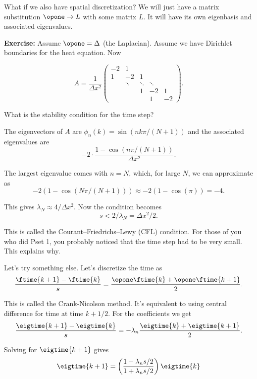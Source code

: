 \begin{frame}{What if we also have spatial discretization?}
	\pause
	We will just have a matrix substitution $ \opone \to L $ with some matrix $ L $. It will have its own eigenbasis and associated eigenvalues.
	
	\pause
	\textbf{Exercise:} Assume $ \opone = \Delta $ (the Laplacian). Assume we have Dirichlet boundaries for the heat equation. Now 
	
	\[  
	A = \frac{1}{\Delta x^2} \begin{pmatrix}
		 -2 & 1  &   &  &  \\
		1 & -2 & 1  &   &    \\
		&  \ddots & \ddots & \ddots  &  \\
		& & 1 & -2 & 1 \\
		& & & 1 & -2 
	\end{pmatrix}.
	\]
	
	What is the stability condition for the time step?
\end{frame}

\begin{frame}
	The eigenvectors of $ A $ are $ \phi_n(k) = \sin(n k \pi/(N+1)) $ and the associated eigenvalues are 
	$$ -2\cdot\frac{1-\cos(n\pi/(N+1))}{\Delta x^2}. $$
	
	\pause
	The largest eigenvalue comes with $ n = N $, which, for large $ N $, we can approximate as
	$$ -2(1-\cos(N\pi/(N+1))) \approx -2(1 - \cos(\pi)) = -4. $$
	
	\pause
	This gives $ \lambda_N \approx 4/\Delta x^2. $ Now the condition becomes 
	\[  
	s < 2/\lambda_N = \Delta x^2/2.
	\]
	
	\pause
	This is called the Courant–Friedrichs–Lewy (CFL) condition. For those of you who did Pset 1, you probably noticed that the time step had to be very small. This explains why.
\end{frame}

\begin{frame}
	Let's try something else. Let's discretize the time as 
	\[ \frac{\ftime{k+1} - \ftime{k}}{s} = \frac{\opone \ftime{k} +  \opone \ftime{k+1}}{2}. \]
	
	\pause
	This is called the Crank-Nicolson method. It's equivalent to using central difference for time at time $ k+1/2 $. For the coefficients we get 
		\[ \frac{\eigtime{k+1} - \eigtime{k}}{s} = -\lambda_n \frac{ \eigtime{k} +  \eigtime{k+1}}{2}. \]
	
	\pause
	Solving for $ \eigtime{k+1} $ gives 
	\[ \eigtime{k+1} = \left(
	\frac{1 - \lambda_n s/2 }{1 + \lambda_n s/ 2}
	\right) \eigtime{k} \]
	
\end{frame}

